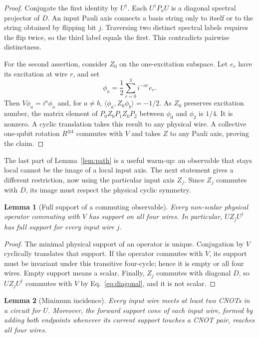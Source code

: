 \documentclass[11pt]{article}
\newtheorem{lemma}{Lemma}
\begin{document}
\begin{proof}
Conjugate the first identity by $U^\dagger$.  Each $U^\dagger P_aU$ is a
diagonal spectral projector of $D$.  An input Pauli axis connects a basis
string only to itself or to the string obtained by flipping bit $j$.
Traversing two distinct spectral labels requires the flip twice, so the
third label equals the first.  This contradicts pairwise distinctness.

For the second assertion, consider $Z_0$ on the one-excitation subspace.
Let $e_r$ have its excitation at wire $r$, and set
\begin{equation}\label{eq:fourier}
\phi_a=\frac12\sum_{r=0}^{3}i^{-ar}e_r.
\end{equation}
Then $V\phi_a=i^a\phi_a$ and, for $a\ne b$,
$\langle\phi_a,Z_0\phi_b\rangle=-1/2$.  As $Z_0$ preserves excitation
number, the matrix element of $P_0Z_0P_1Z_0P_2$ between $\phi_0$ and
$\phi_2$ is $1/4$.  It is nonzero.  A cyclic translation takes this result
to any physical wire.  A collective one-qubit rotation $R^{\otimes4}$
commutes with $V$ and takes $Z$ to any Pauli axis, proving the claim.
\end{proof}

The last part of Lemma~\ref{lem:path} is a useful warm-up: an observable
that stays local cannot be the image of a local input axis. The next
statement gives a different restriction, now using the particular input
axis $Z_j$. Since $Z_j$ commutes with $D$, its image must respect the
physical cyclic symmetry.

\begin{lemma}[Full support of a commuting observable]\label{lem:support}
Every non-scalar physical operator commuting with $V$ has support on all
four wires.  In particular, $UZ_jU^\dagger$ has full support for every
input wire $j$.
\end{lemma}

\begin{proof}
The minimal physical support of an operator is unique.  Conjugation by
$V$ cyclically translates that support.  If the operator commutes with
$V$, its support must be invariant under this transitive four-cycle; hence
it is empty or all four wires.  Empty support means a scalar.  Finally,
$Z_j$ commutes with diagonal $D$, so $UZ_jU^\dagger$ commutes with $V$ by
Eq.~\eqref{eq:diagonal}, and it is not scalar.
\end{proof}

\begin{lemma}[Minimum incidence]\label{lem:degree}
Every input wire meets at least two CNOTs in a circuit for $U$.
Moreover, the forward support cone of each input wire, formed by adding
both endpoints whenever its current support touches a CNOT pair, reaches
all four wires.
\end{lemma}
\end{document}
